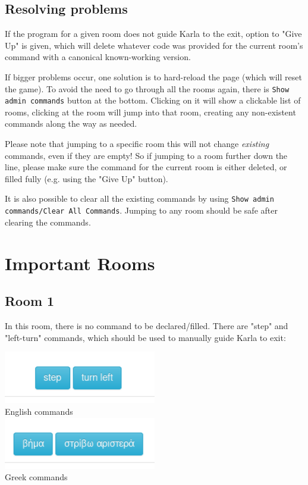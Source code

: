 \documentclass{article}
\begin{document}
\subsection{Resolving problems}

If the program for a given room does not guide Karla to the exit, option to "Give
Up" is given, which will delete whatever code was provided for the current room's
command with a canonical known-working version.

If bigger problems occur, one solution is to hard-reload the page (which will reset
the game). To avoid the need to go through all the rooms again, there is \texttt{Show
admin commands} button at the bottom. Clicking on it will show a clickable list of rooms,
clicking at the room will jump into that room, creating any non-existent commands
along the way as needed.

Please note that jumping to a specific room this will not change \emph{existing} commands,
even if they are empty! So if jumping to a room further down the line, please make
sure the command for the current room is either deleted, or filled fully (e.g. using
the "Give Up" button).

It is also possible to clear all the existing commands by using \texttt{Show admin commands/Clear All Commands}.
Jumping to any room should be safe after clearing the commands.

\section{Important Rooms}

\subsection{Room 1}

In this room, there is no command to be declared/filled. There are "step" and "left-turn"
commands, which should be used to manually guide Karla to exit:

\begin{center}
\includegraphics[width=0.5\textwidth]{step-left_en}\\
English commands\\
\includegraphics[width=0.5\textwidth]{step-left_el}\\
Greek commands
\end{center}
\end{document}
